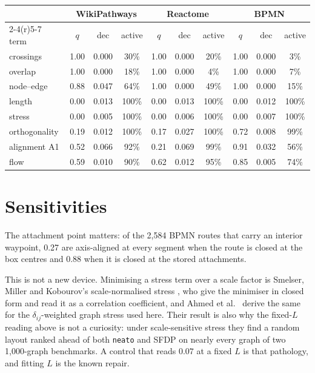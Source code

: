 \documentclass[a4paper,UKenglish]{gd-lipics-v3}
\begin{document}
\begin{center}\small
\begin{tabular}{@{}lccc@{\hspace{14pt}}ccc@{\hspace{14pt}}ccc@{}}
\toprule
& \multicolumn{3}{c}{WikiPathways} & \multicolumn{3}{c}{Reactome} & \multicolumn{3}{c}{BPMN} \\
\cmidrule(r){2-4}\cmidrule(r){5-7}\cmidrule{8-10}
term & $q$ & dec & active & $q$ & dec & active & $q$ & dec & active \\
\midrule
crossings      & 1.00 & 0.000 & 30\% & 1.00 & 0.000 & 20\% & 1.00 & 0.000 & 3\% \\
overlap        & 1.00 & 0.000 & 18\% & 1.00 & 0.000 & 4\%  & 1.00 & 0.000 & 7\% \\
node--edge     & 0.88 & 0.047 & 64\% & 1.00 & 0.000 & 49\% & 1.00 & 0.000 & 15\% \\
\midrule
length         & 0.00 & 0.013 & 100\% & 0.00 & 0.013 & 100\% & 0.00 & 0.012 & 100\% \\
stress         & 0.00 & 0.005 & 100\% & 0.00 & 0.006 & 100\% & 0.00 & 0.007 & 100\% \\
orthogonality  & 0.19 & 0.012 & 100\% & 0.17 & 0.027 & 100\% & 0.72 & 0.008 & 99\% \\
alignment A1   & 0.52 & 0.066 & 92\%  & 0.21 & 0.069 & 99\%  & 0.91 & 0.032 & 56\% \\
flow           & 0.59 & 0.010 & 90\%  & 0.62 & 0.012 & 95\%  & 0.85 & 0.005 & 74\% \\
\bottomrule
\end{tabular}
\end{center}

\section{Sensitivities}\label{app:sens}

The attachment point matters: of the 2{,}584 BPMN routes that carry an interior
waypoint, 0.27 are axis-aligned at every segment when the route is closed at the box
centres and 0.88 when it is closed at the stored attachments.

This is not a new device. Minimising a stress term
over a scale factor is Smelser, Miller and Kobourov's scale-normalised stress
\cite{smelser24}, who give the minimiser in closed form and read it as a correlation
coefficient, and Ahmed et al.\ \cite{ahmed24} derive the same for the $\delta_{ij}$-weighted
graph stress used here. Their result is also why the fixed-$L$ reading above is not a
curiosity: under scale-sensitive stress they find a random layout ranked ahead of both
\texttt{neato} and SFDP on nearly every graph of two 1{,}000-graph benchmarks. A
control that reads $0.07$ at a fixed $L$ is that pathology, and fitting $L$ is the known
repair.
\end{document}

